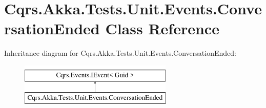 \hypertarget{classCqrs_1_1Akka_1_1Tests_1_1Unit_1_1Events_1_1ConversationEnded}{}\section{Cqrs.\+Akka.\+Tests.\+Unit.\+Events.\+Conversation\+Ended Class Reference}
\label{classCqrs_1_1Akka_1_1Tests_1_1Unit_1_1Events_1_1ConversationEnded}
Inheritance diagram for Cqrs.\+Akka.\+Tests.\+Unit.\+Events.\+Conversation\+Ended\+:\begin{figure}[H]
\begin{center}
\leavevmode
\includegraphics[height=2.000000cm]{classCqrs_1_1Akka_1_1Tests_1_1Unit_1_1Events_1_1ConversationEnded}
\end{center}
\end{figure}
